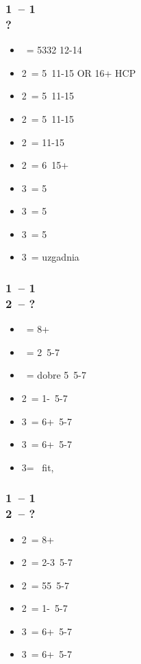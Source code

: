\documentclass[12pt, a4paper]{report}
\begin{document}
{    \subsubsection*{1\spades\ -- 1\ntx\ \\ ?}
    \begin{itemize}
        \item \pass\ = 5332 12-14
        \item 2\clubs\ = 5\spades\clubs\ 11-15 OR 16+ HCP \fonce
        \item 2\diams\ = 5\diams\ 11-15
        \item 2\hearts\ = 5\hearts\ 11-15
        \item 2\spades\ = 11-15
        \item 2\ntx\ = 6\minor\ 15+
        \item 3\clubs\ = 5\clubs\ \gf
        \item 3\diams\ = 5\diams\ \gf
        \item 3\hearts\ = 5\hearts\ \gf
        \item 3\spades\ = uzgadnia \spades\ \gf
    \end{itemize}

    \subsubsection*{1\hearts\ -- 1\spades\ \\ 2\clubs\ -- ?}
    \begin{itemize}
        \item \diams\ = 8+
        \item \hearts\ = 2\hearts\ 5-7
        \item \spades\ = dobre 5\spades\ 5-7
        \item 2\ntx\ = 1-\hearts\ 5-7
        \item 3\clubs\ = 6+\clubs\ 5-7
        \item 3\diams\ = 6+\diams\ 5-7
        \item 3\hearts = \hearts\ fit, \gf
    \end{itemize}

    \subsubsection*{1\hearts\ -- 1\ntx\ \\ 2\clubs\ -- ?}
    \begin{itemize}
        \item 2\diams\ = 8+
        \item 2\hearts\ = 2-3\hearts\ 5-7
        \item 2\spades\ = 55\minor\ 5-7
        \item 2\nt\ = 1-\hearts\ 5-7
        \item 3\clubs\ = 6+\clubs\ 5-7
        \item 3\diams\ = 6+\diams\ 5-7
    \end{itemize}

}
\end{document}
